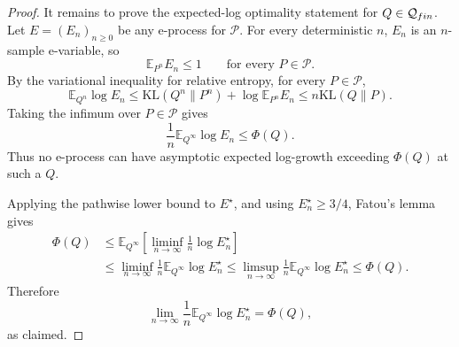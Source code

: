 \documentclass[10pt,a4paper]{amsart}
\newcommand{\KL}{\mathrm{KL}}
\begin{document}
\begin{proof}
It remains to prove the expected-log optimality statement for \(Q\in\mathcal Q_{\rm fin}\). Let
\(E=(E_n)_{n\ge0}\) be any e-process for \(\mathcal P\). For every deterministic \(n\), \(E_n\) is an
\(n\)-sample e-variable, so
\[
  \mathbb E_{P^n}E_n\le1
  \qquad\text{for every }P\in\mathcal P.
\]
By the variational inequality for relative entropy, for every \(P\in\mathcal P\),
\[
  \mathbb E_{Q^n}\log E_n
  \le
  \KL(Q^n\|P^n)+\log\mathbb E_{P^n}E_n
  \le
  n\KL(Q\|P).
\]
Taking the infimum over \(P\in\mathcal P\) gives
\[
  \frac1n\mathbb E_{Q^\infty}\log E_n
  \le
  \Phi(Q).
\]
Thus no e-process can have asymptotic expected log-growth exceeding \(\Phi(Q)\) at such a \(Q\).

Applying the pathwise lower bound to \(E^\star\), and using \(E^\star_n\ge3/4\), Fatou's lemma gives
\[
\begin{aligned}
  \Phi(Q)
  &\le
  \mathbb E_{Q^\infty}
  \left[
    \liminf_{n\to\infty}
    \frac1n\log E^\star_n
  \right]  \\
  &\le
  \liminf_{n\to\infty}
  \frac1n\mathbb E_{Q^\infty}\log E^\star_n
  \le
  \limsup_{n\to\infty}
  \frac1n\mathbb E_{Q^\infty}\log E^\star_n
  \le
  \Phi(Q).
\end{aligned}
\]
Therefore
\[
  \lim_{n\to\infty}
  \frac1n\mathbb E_{Q^\infty}\log E^\star_n
  =
  \Phi(Q),
\]
as claimed.
\end{proof}
\end{document}
